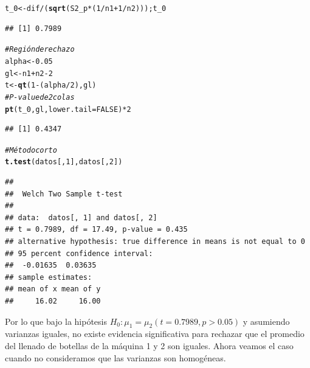 \documentclass[a4paper]{scrartcl}\usepackage[]{graphicx}\usepackage[]{color}
\makeatletter
\newcommand{\hlnum}[1]{\textcolor[rgb]{0.686,0.059,0.569}{#1}}%
\newcommand{\hlcom}[1]{\textcolor[rgb]{0.678,0.584,0.686}{\textit{#1}}}%
\newcommand{\hlopt}[1]{\textcolor[rgb]{0,0,0}{#1}}%
\newcommand{\hlstd}[1]{\textcolor[rgb]{0.345,0.345,0.345}{#1}}%
\newcommand{\hlkwb}[1]{\textcolor[rgb]{0.69,0.353,0.396}{#1}}%
\newcommand{\hlkwc}[1]{\textcolor[rgb]{0.333,0.667,0.333}{#1}}%
\newcommand{\hlkwd}[1]{\textcolor[rgb]{0.737,0.353,0.396}{\textbf{#1}}}%
\newenvironment{kframe}{%
 \def\at@end@of@kframe{}%
 \ifinner\ifhmode%
  \def\at@end@of@kframe{\end{minipage}}%
  \begin{minipage}{\columnwidth}%
 \fi\fi%
 \def\FrameCommand##1{\hskip\@totalleftmargin \hskip-\fboxsep
 \colorbox{shadecolor}{##1}\hskip-\fboxsep
     \hskip-\linewidth \hskip-\@totalleftmargin \hskip\columnwidth}%
 \MakeFramed {\advance\hsize-\width
   \@totalleftmargin\z@ \linewidth\hsize
   \@setminipage}}%
 {\par\unskip\endMakeFramed%
 \at@end@of@kframe}
\newenvironment{knitrout}{}{} %
\makeatother
\begin{document}
\begin{knitrout}
\begin{kframe}
\begin{alltt}
\hlstd{t_0} \hlkwb{<-} \hlstd{dif}\hlopt{/}\hlstd{(}\hlkwd{sqrt}\hlstd{(S2_p}\hlopt{*}\hlstd{(}\hlnum{1}\hlopt{/}\hlstd{n1} \hlopt{+} \hlnum{1}\hlopt{/}\hlstd{n2))); t_0}
\end{alltt}
\begin{verbatim}
## [1] 0.7989
\end{verbatim}
\begin{alltt}
\hlcom{# Región de rechazo}
\hlstd{alpha} \hlkwb{<-} \hlnum{0.05}
\hlstd{gl} \hlkwb{<-} \hlstd{n1} \hlopt{+} \hlstd{n2} \hlopt{-} \hlnum{2}
\hlstd{t} \hlkwb{<-} \hlkwd{qt}\hlstd{(}\hlnum{1} \hlopt{-} \hlstd{(alpha}\hlopt{/}\hlnum{2}\hlstd{), gl)}
\hlcom{# P-value de 2 colas}
\hlkwd{pt}\hlstd{(t_0, gl,} \hlkwc{lower.tail} \hlstd{=} \hlnum{FALSE}\hlstd{)} \hlopt{*} \hlnum{2}
\end{alltt}
\begin{verbatim}
## [1] 0.4347
\end{verbatim}
\begin{alltt}
\hlcom{# Método corto}
\hlkwd{t.test}\hlstd{(datos[,} \hlnum{1}\hlstd{], datos[,} \hlnum{2}\hlstd{])}
\end{alltt}
\begin{verbatim}
## 
## 	Welch Two Sample t-test
## 
## data:  datos[, 1] and datos[, 2]
## t = 0.7989, df = 17.49, p-value = 0.435
## alternative hypothesis: true difference in means is not equal to 0
## 95 percent confidence interval:
##  -0.01635  0.03635
## sample estimates:
## mean of x mean of y 
##     16.02     16.00
\end{verbatim}
\end{kframe}
\end{knitrout}

\noindent Por lo que bajo la hipótesis $H_0: \mu_1 = \mu_2 (t= 0.7989,p>0.05)$ y asumiendo varianzas iguales, no existe evidencia significativa para rechazar que el promedio del llenado de botellas de la máquina 1 y 2 son iguales. Ahora veamos el caso cuando no consideramos que las varianzas son homogéneas.

\newpage
\end{document}
